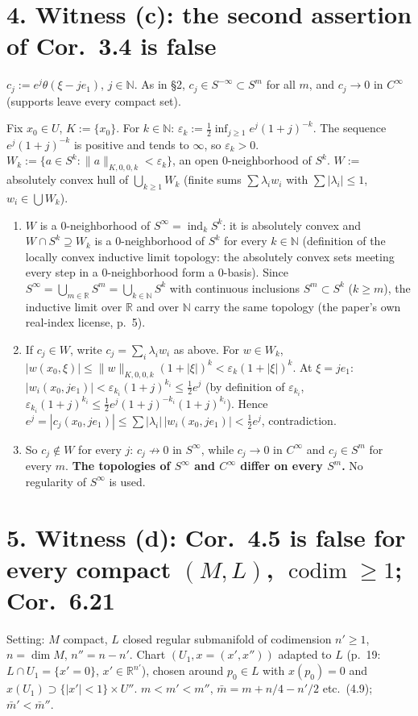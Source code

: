 \documentclass[11pt]{article}
\newcommand{\R}{\mathbb{R}}
\newcommand{\N}{\mathbb{N}}
\DeclareMathOperator{\ind}{ind}
\begin{document}
\section*{4. Witness (c): the second assertion of Cor.~3.4 is false}
$c_j:=e^j\theta(\xi-je_1)$, $j\in\N$. As in \S2, $c_j\in S^{-\infty}\subset S^m$ for all $m$, and $c_j\to0$ in $C^\infty$ (supports leave every compact set).

Fix $x_0\in U$, $K:=\{x_0\}$. For $k\in\N$: $\varepsilon_k:=\tfrac12\inf_{j\ge1}e^j(1+j)^{-k}$. The sequence $e^j(1+j)^{-k}$ is positive and tends to $\infty$, so $\varepsilon_k>0$. $W_k:=\{a\in S^k:\|a\|_{K,0,0,k}<\varepsilon_k\}$, an open 0-neighborhood of $S^k$. $W:=$ absolutely convex hull of $\bigcup_{k\ge1}W_k$ (finite sums $\sum\lambda_iw_i$ with $\sum|\lambda_i|\le1$, $w_i\in\bigcup W_k$).
\begin{enumerate}
\item $W$ is a 0-neighborhood of $S^\infty=\ind_kS^k$: it is absolutely convex and $W\cap S^k\supseteq W_k$ is a 0-neighborhood of $S^k$ for every $k\in\N$ (definition of the locally convex inductive limit topology: the absolutely convex sets meeting every step in a 0-neighborhood form a 0-basis). Since $S^\infty=\bigcup_{m\in\R}S^m=\bigcup_{k\in\N}S^k$ with continuous inclusions $S^m\subset S^k$ ($k\ge m$), the inductive limit over $\R$ and over $\N$ carry the same topology (the paper's own real-index license, p.~5).
\item If $c_j\in W$, write $c_j=\sum_i\lambda_iw_i$ as above. For $w\in W_k$, $|w(x_0,\xi)|\le\|w\|_{K,0,0,k}(1+|\xi|)^k<\varepsilon_k(1+|\xi|)^k$. At $\xi=je_1$: $|w_i(x_0,je_1)|<\varepsilon_{k_i}(1+j)^{k_i}\le\tfrac12e^j$ (by definition of $\varepsilon_{k_i}$, $\varepsilon_{k_i}(1+j)^{k_i}\le\tfrac12e^j(1+j)^{-k_i}(1+j)^{k_i}$). Hence $e^j=|c_j(x_0,je_1)|\le\sum|\lambda_i|\,|w_i(x_0,je_1)|<\tfrac12e^j$, contradiction.
\item So $c_j\notin W$ for every $j$: $c_j\not\to0$ in $S^\infty$, while $c_j\to0$ in $C^\infty$ and $c_j\in S^m$ for every $m$. \textbf{The topologies of $S^\infty$ and $C^\infty$ differ on every $S^m$.} No regularity of $S^\infty$ is used.
\end{enumerate}

\section*{5. Witness (d): Cor.~4.5 is false for every compact $(M,L)$, $\operatorname{codim}\ge1$; Cor.~6.21}
Setting: $M$ compact, $L$ closed regular submanifold of codimension $n'\ge1$, $n=\dim M$, $n''=n-n'$. Chart $(U_1,x=(x',x''))$ adapted to $L$ (p.~19: $L\cap U_1=\{x'=0\}$, $x'\in\R^{n'}$), chosen around $p_0\in L$ with $x(p_0)=0$ and $x(U_1)\supset\{|x'|<1\}\times U''$. $m<m'<m''$, $\bar m=m+n/4-n'/2$ etc.\ (4.9); $\bar m'<\bar m''$.
\end{document}

